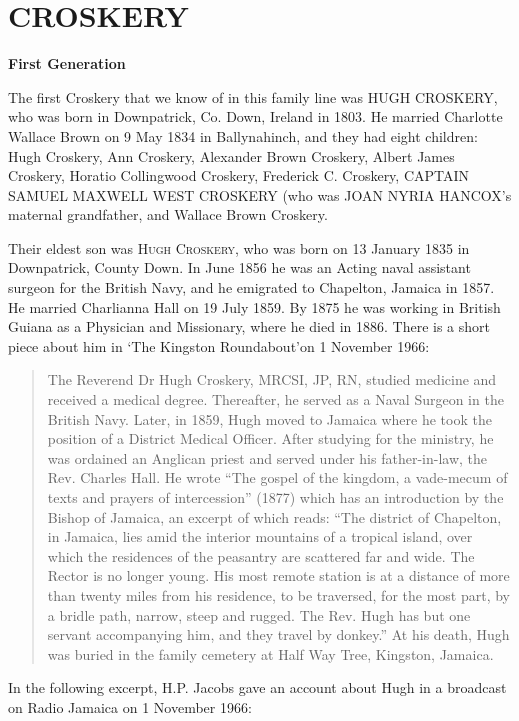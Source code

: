 \section{CROSKERY}

\textbf{First Generation}

The first Croskery that we know of in this family line was \uppercase{Hugh Croskery}, who was born in Downpatrick, Co. Down, Ireland in 1803.  He married Charlotte Wallace Brown on 9 May 1834 in Ballynahinch,  and they had eight children: Hugh Croskery, Ann Croskery, Alexander Brown Croskery, Albert James Croskery, Horatio Collingwood Croskery, Frederick C. Croskery, \uppercase{Captain Samuel Maxwell West Croskery} (who was \uppercase{Joan Nyria Hancox}'s maternal grandfather, and Wallace Brown Croskery.

Their eldest son was \textsc{Hugh Croskery},  who was born on 13 January 1835 in Downpatrick, County Down. In June 1856 he was an Acting naval assistant surgeon for the British Navy, and he emigrated to Chapelton, Jamaica in 1857.  He married Charlianna Hall on 19 July 1859. By 1875 he was working in British Guiana as a Physician and Missionary, where he died in 1886. There is a short piece about him in `The Kingston Roundabout'on 1 November 1966:
\begin{quotation}
The Reverend Dr Hugh Croskery, MRCSI, JP, RN, studied medicine and received a medical degree. Thereafter, he served as a Naval Surgeon in the British Navy. Later, in 1859, Hugh moved to Jamaica where he took the position of a District Medical Officer. After studying for the ministry, he was ordained an Anglican priest and served under his father-in-law, the Rev. Charles Hall. He wrote ``The gospel of the kingdom, a vade-mecum of texts and prayers of intercession'' (1877) which has an introduction by the Bishop of Jamaica, an excerpt of which reads: ``The district of Chapelton, in Jamaica, lies amid the interior mountains of a tropical island, over which the residences of the peasantry are scattered far and wide. The Rector is no longer young. His most remote station is at a distance of more than twenty miles from his residence, to be traversed, for the most part, by a bridle path, narrow, steep and rugged. The Rev. Hugh has but one servant accompanying him, and they travel by donkey.'' At his death, Hugh was buried in the family cemetery at Half Way Tree, Kingston, Jamaica.
\end{quotation}
In the following excerpt, H.P. Jacobs gave an account about Hugh in a broadcast on Radio Jamaica on 1 November 1966:
